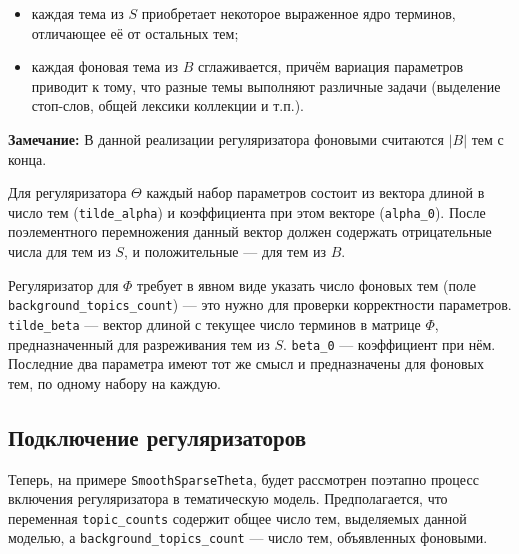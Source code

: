 \begin{itemize}
	\item каждая тема из $S$ приобретает некоторое выраженное ядро терминов, отличающее её от остальных тем;
	\item каждая фоновая тема из $B$ сглаживается, причём вариация параметров приводит к тому, что разные темы выполняют различные задачи (выделение стоп-слов, общей лексики коллекции и т.п.).
\end{itemize}

{\bf Замечание:} В данной реализации регуляризатора фоновыми считаются $|B|$ тем с конца.

Для регуляризатора $\Theta$ каждый набор параметров состоит из вектора длиной в число тем (\verb|tilde_alpha|) и коэффициента при этом векторе (\verb|alpha_0|). После поэлементного перемножения данный вектор должен содержать отрицательные числа для тем из $S$, и положительные --- для тем из $B$.

Регуляризатор для $\Phi$ требует в явном виде указать число фоновых тем (поле \verb|background_topics_count|) --- это нужно для проверки корректности параметров. \verb'tilde_beta' --- вектор длиной с текущее число терминов в матрице $\Phi$, предназначенный для разреживания тем из $S$. \verb'beta_0' --- коэффициент при нём. Последние два параметра имеют тот же смысл и предназначены для фоновых тем, по одному набору на каждую.  

\subsection{Подключение регуляризаторов}

Теперь, на примере \verb|SmoothSparseTheta|, будет рассмотрен поэтапно процесс включения регуляризатора в тематическую модель. Предполагается, что переменная \verb|topic_counts| содержит общее число тем, выделяемых данной моделью, а \verb|background_topics_count| --- число тем, объявленных фоновыми.

